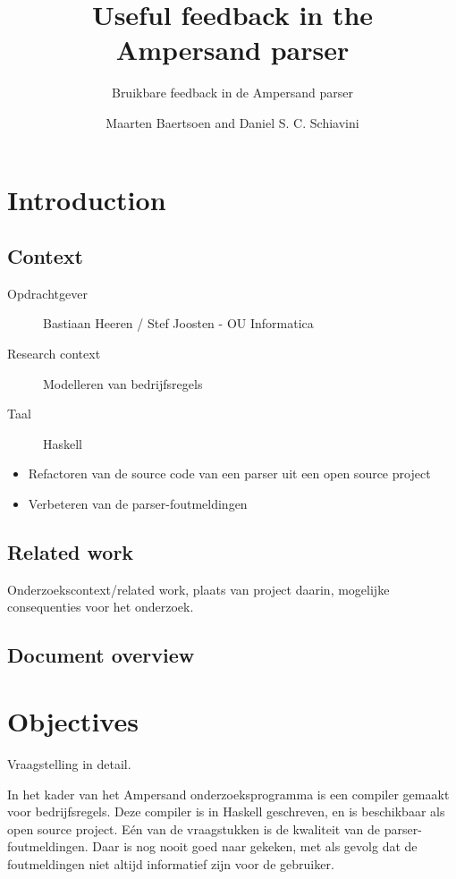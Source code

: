 \documentclass[a4paper,12pt,abstracton,titlepage]{scrartcl}
\author{Maarten Baertsoen and Daniel S. C. Schiavini}
\affil{Open Universiteit Nederland\\
	Afstudeerproject Bachelor Informatica}
\title{Useful feedback in the\\ Ampersand parser}
\subtitle{Bruikbare feedback in de Ampersand parser}
\begin{document}
\maketitle
\newpage

\tableofcontents
\clearpage

\section{Introduction}
\subsection{Context}
\begin{description}
\item [Opdrachtgever] Bastiaan Heeren / Stef Joosten - OU Informatica
\item [Research context] Modelleren van bedrijfsregels
\item [Taal] Haskell
\end{description}

\begin{itemize}
\item Refactoren van de source code van een parser uit een open source project 
\item Verbeteren van de parser-foutmeldingen
\end{itemize}

\subsection{Related work}
Onderzoekscontext/related work, plaats van project daarin, mogelijke consequenties voor het onderzoek.

\subsection{Document overview}
\lipsum[1]

\newpage
\section{Objectives}
Vraagstelling in detail.

In het kader van het Ampersand onderzoeksprogramma is een compiler gemaakt voor bedrijfsregels. Deze compiler is in Haskell geschreven, en is beschikbaar als open source project. Eén van de vraagstukken is de kwaliteit van de parser-foutmeldingen. Daar is nog nooit goed naar gekeken, met als gevolg dat de foutmeldingen niet altijd informatief zijn voor de gebruiker.
\end{document}
